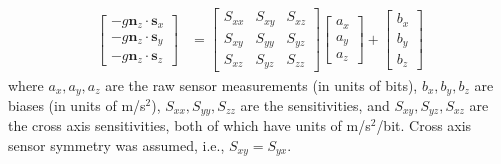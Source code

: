 \begin{align}
  \label{rb:eq:sensormodel}
  \left[
    \begin{matrix}
      -g\bm{n}_z \cdot \bm{s}_x \\
      -g\bm{n}_z \cdot \bm{s}_y \\
      -g\bm{n}_z \cdot \bm{s}_z
    \end{matrix}
  \right]
  &=
  \left[
    \begin{matrix}
      S_{xx} & S_{xy} & S_{xz}\\
      S_{xy} & S_{yy} & S_{yz}\\
      S_{xz} & S_{yz} & S_{zz}
    \end{matrix}
  \right]
  \left[
    \begin{matrix}
      a_{x} \\
      a_{y} \\
      a_{z}
    \end{matrix}
  \right]
  +
  \left[
    \begin{matrix}
      b_{x} \\
      b_{y} \\
      b_{z}
    \end{matrix}
  \right]
\end{align}
where $a_x, a_y, a_z$ are the raw sensor measurements (in units of bits), $b_x,
b_y, b_z$ are biases (in units of m/s$^2$), $S_{xx}, S_{yy}, S_{zz}$ are the
sensitivities, and $S_{xy}, S_{yz}, S_{xz}$ are the cross axis sensitivities,
both of which have units of m/s$^2$/bit. Cross axis sensor symmetry was
assumed, i.e., $S_{xy} = S_{yx}$.

